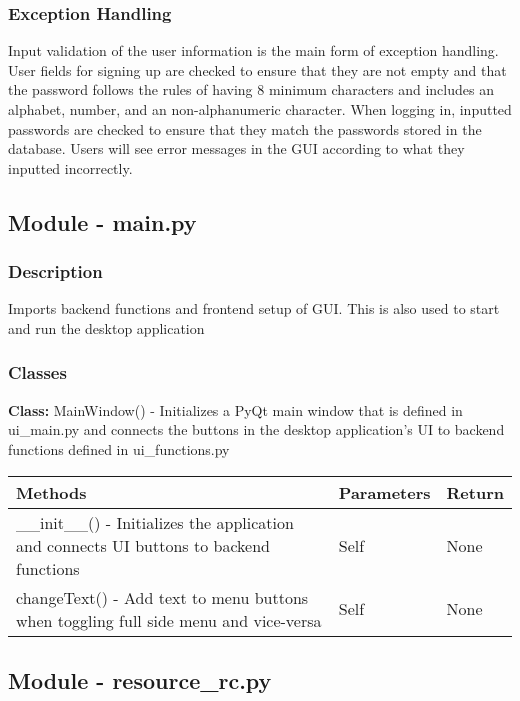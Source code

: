 \documentclass[12pt, titlepage]{article}
\begin{document}
  \subsubsection{Exception Handling}
  Input validation of the user information is the main form of exception handling. User fields for signing up are checked to ensure that they are not empty and that the password follows the rules of having 8 minimum characters and includes an alphabet, number, and an non-alphanumeric character. When logging in, inputted passwords are checked to ensure that they match the passwords stored in the database. Users will see error messages in the GUI according to what they inputted incorrectly.

  \subsection{Module - main.py}

  \subsubsection{Description}
  Imports backend functions and frontend setup of GUI. This is also used to start and run the desktop application

  \subsubsection{Classes}
  \textbf{Class:} MainWindow() - Initializes a PyQt main window that is defined in ui\_main.py and connects the buttons in the desktop application’s UI to backend functions defined in ui\_functions.py \\

    \noindent \begin{tabular}{| p{} | p{}| p{}|}
      \hline
      \rowcolor[gray]{0.9}
      Methods & Parameters & Return\\
      \hline
      \_\_init\_\_() - Initializes the application and connects UI buttons to backend functions &  Self & None \\
      \hline
      changeText() - Add text to menu buttons when toggling full side menu and vice-versa & Self & None \\
      \hline
    \end{tabular}

  \subsection{Module - resource\_rc.py}
\end{document}
